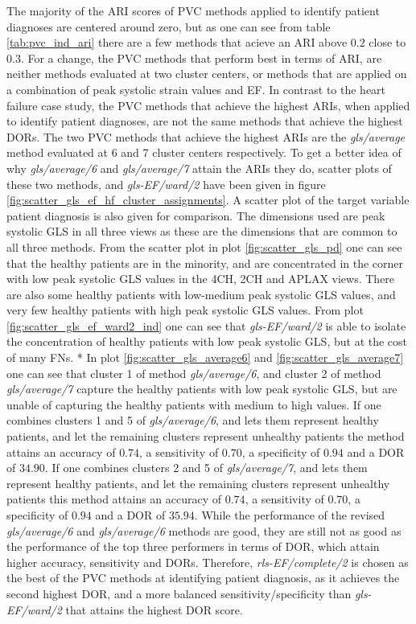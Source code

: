 The majority of the ARI scores of PVC methods applied to identify patient diagnoses are centered around zero, but as one can see from table \ref{tab:pvc_ind_ari}
there are a few methods that acieve an ARI above $0.2$ close to $0.3$.
For a change, the PVC methods that perform best in terms of ARI, are neither methods evaluated at two cluster centers, or methods that are applied on a combination
of peak systolic strain values and EF.
In contrast to the heart failure case study, the PVC methods that achieve the highest ARIs, when applied to identify patient diagnoses, are not the same methods that achieve the 
highest DORs.
The two PVC methods that achieve the highest ARIs are the \textit{gls/average} method evaluated at 6 and 7 cluster centers respectively. 
To get a better idea of why \textit{gls/average/6} and \textit{gls/average/7} attain the ARIs they do, scatter plots of these two methods, and \textit{gls-EF/ward/2}
have been given in figure \ref{fig:scatter_gls_ef_hf_cluster_assignments}. A scatter plot of the target variable patient diagnosis is also given for comparison.
The dimensions used are peak systolic GLS in all three views as these are the dimensions that are common to all three methods.
From the scatter plot in plot \ref{fig:scatter_gls_pd} one can see that the healthy patients are in the minority, and are concentrated in the corner 
with low peak systolic GLS values in the 4CH, 2CH and APLAX views. 
There are also some healthy patients with low-medium peak systolic GLS values, and very few healthy patients with high peak systolic GLS values.
From plot \ref{fig:scatter_gls_ef_ward2_ind} one can see that \textit{gls-EF/ward/2} is able to isolate the concentration of healthy patients with low peak systolic GLS, 
but at the cost of many FNs.
* In plot \ref{fig:scatter_gls_average6} and \ref{fig:scatter_gls_average7} one can see that cluster 1 of method \textit{gls/average/6}, 
and cluster 2 of method \textit{gls/average/7} capture the healthy patients with low peak systolic GLS, but are unable of capturing the healthy patients with
medium to high values.
If one combines clusters 1 and 5 of \textit{gls/average/6}, and lets them represent healthy patients, and let the remaining clusters represent unhealthy patients the method attains 
an accuracy of $0.74$, a sensitivity of $0.70$, a specificity of $0.94$ and a DOR of $34.90$.
If one combines clusters 2 and 5 of \textit{gls/average/7}, and lets them represent healthy patients, and let the remaining clusters represent unhealthy patients this method attains 
an accuracy of $0.74$, a sensitivity of $0.70$, a specificity of $0.94$ and a DOR of $35.94$.
While the performance of the revised \textit{gls/average/6} and \textit{gls/average/6} methods are good, 
they are still not as good as the performance of the top three performers in terms of DOR, which attain higher accuracy, sensitivity and DORs.
Therefore, \textit{rls-EF/complete/2} is chosen as the best of the PVC methods at identifying patient diagnosis, as it achieves the second highest DOR, 
and a more balanced sensitivity/specificity than \textit{gls-EF/ward/2} that attains the highest DOR score.


